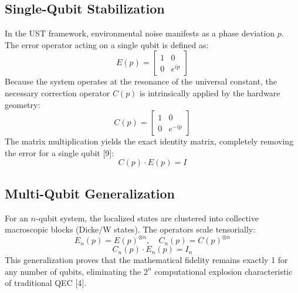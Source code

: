 \documentclass[12pt,a4paper]{article}
\begin{document}
\subsection{Single-Qubit Stabilization}
In the UST framework, environmental noise manifests as a phase deviation $p$. The error operator acting on a single qubit is defined as:
\begin{equation}
E(p) = \begin{bmatrix} 1 & 0 \\ 0 & e^{ip} \end{bmatrix}
\end{equation}
Because the system operates at the resonance of the universal constant, the necessary correction operator $C(p)$ is intrinsically applied by the hardware geometry:
\begin{equation}
C(p) = \begin{bmatrix} 1 & 0 \\ 0 & e^{-ip} \end{bmatrix}
\end{equation}
The matrix multiplication yields the exact identity matrix, completely removing the error for a single qubit [9]:
\begin{equation}
C(p) \cdot E(p) = I
\end{equation}

\subsection{Multi-Qubit Generalization}
For an $n$-qubit system, the localized states are clustered into collective macroscopic blocks (Dicke/W states). The operators scale tensorially:
\begin{equation}
E_n(p) = E(p)^{\otimes n}, \quad C_n(p) = C(p)^{\otimes n}
\end{equation}
\begin{equation}
C_n(p) \cdot E_n(p) = I_n
\end{equation}
This generalization proves that the mathematical fidelity remains exactly 1 for any number of qubits, eliminating the $2^n$ computational explosion characteristic of traditional QEC [4].
\end{document}

